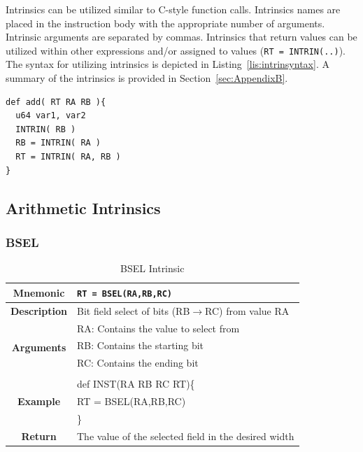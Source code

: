 \documentclass{article}
\begin{document}
Intrinsics can be utilized similar to C-style function calls.  Intrinsics names are placed in the instruction body 
with the appropriate number of arguments.  Intrinsic arguments are separated by commas.  Intrinsics that return 
values can be utilized within other expressions and/or assigned to values (\texttt{RT = INTRIN(..)}).  
The syntax for utilizing intrinsics is depicted in Listing~\ref{lis:intrinsyntax}.  A summary of the intrinsics is provided 
in Section~\ref{sec:AppendixB}.    

\vspace{0.125in}
\begin{lstlisting}[frame=single,style=base,caption={Intrinsic Syntax},captionpos=b,label={lis:intrinsyntax}]
def add( RT RA RB ){
  u64 var1, var2
  INTRIN( RB )
  RB = INTRIN( RA )
  RT = INTRIN( RA, RB )
}
\end{lstlisting}

\clearpage
\subsection{Arithmetic Intrinsics}
\label{sec:ArithIntrinsics}

\subsubsection{BSEL}
\label{sec:BSEL}

\begin{table}[h]
\begin{center}
\caption{BSEL Intrinsic}
\vspace{0.125in}
\label{tab:BSELIntrinsic}
\begin{tabular}{|c|l|}
\hline
\textbf{Mnemonic} & \texttt{RT = BSEL(RA,RB,RC)}\\
\hline
\textbf{Description} & Bit field select of bits (RB$\rightarrow$RC) from value RA\\
\hline
\multirow{4}{*}{\textbf{Arguments}} & RA: Contains the value to select from\\
                                    & RB: Contains the starting bit\\
                                    & RC: Contains the ending bit\\
                          			     & \\
\hline
\multirow{3}{*}{\textbf{Example}} & def INST(RA RB RC RT)\{\\
                          			  &   RT = BSEL(RA,RB,RC)\\
                                                    & \}\\
\hline
\textbf{Return} & The value of the selected field in the desired width\\
\hline
\end{tabular}
\end{center}
\end{table}
\end{document}
